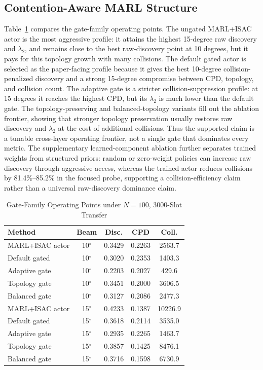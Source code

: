 \documentclass[journal]{IEEEtran}
\begin{document}
\subsection{Contention-Aware MARL Structure}
Table~\ref{tab:n100_baseline} compares the gate-family operating points.
The ungated MARL+ISAC actor is the most aggressive profile: it attains the highest 15-degree raw discovery and $\lambda_2$, and remains close to the best raw-discovery point at 10 degrees, but it pays for this topology growth with many collisions.
The default gated actor is selected as the paper-facing profile because it gives the best 10-degree collision-penalized discovery and a strong 15-degree compromise between CPD, topology, and collision count.
The adaptive gate is a stricter collision-suppression profile: at 15 degrees it reaches the highest CPD, but its $\lambda_2$ is much lower than the default gate.
The topology-preserving and balanced-topology variants fill out the ablation frontier, showing that stronger topology preservation usually restores raw discovery and $\lambda_2$ at the cost of additional collisions.
Thus the supported claim is a tunable cross-layer operating frontier, not a single gate that dominates every metric.
The supplementary learned-component ablation further separates trained weights from structured priors: random or zero-weight policies can increase raw discovery through aggressive access, whereas the trained actor reduces collisions by 81.4\%--85.2\% in the focused probe, supporting a collision-efficiency claim rather than a universal raw-discovery dominance claim.

\begin{table}[!t]
  \centering
  \caption{Gate-Family Operating Points under $N=100$, 3000-Slot Transfer}
  \label{tab:n100_baseline}
  \tiny
  \setlength{\tabcolsep}{3pt}
  \begin{tabular}{lcccc}
    \toprule
    Method & Beam & Disc. & CPD & Coll. \\
    \midrule
    MARL+ISAC actor & 10$^\circ$ & 0.3429 & 0.2263 & 2563.7 \\
    Default gated & 10$^\circ$ & 0.3020 & 0.2353 & 1403.3 \\
    Adaptive gate & 10$^\circ$ & 0.2203 & 0.2027 & 429.6 \\
    Topology gate & 10$^\circ$ & 0.3451 & 0.2000 & 3606.5 \\
    Balanced gate & 10$^\circ$ & 0.3127 & 0.2086 & 2477.3 \\
    \midrule
    MARL+ISAC actor & 15$^\circ$ & 0.4233 & 0.1387 & 10226.9 \\
    Default gated & 15$^\circ$ & 0.3618 & 0.2114 & 3535.0 \\
    Adaptive gate & 15$^\circ$ & 0.2935 & 0.2265 & 1463.7 \\
    Topology gate & 15$^\circ$ & 0.3857 & 0.1425 & 8476.1 \\
    Balanced gate & 15$^\circ$ & 0.3716 & 0.1598 & 6730.9 \\
    \bottomrule
  \end{tabular}
\end{table}
\end{document}
